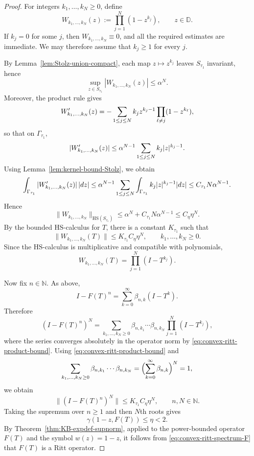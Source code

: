 \documentclass[11pt]{amsart}
\numberwithin{equation}{section}
\theoremstyle{definition}
\theoremstyle{plain}
\def\D{\mathbb{D}}
\newcommand{\HS}{\mathrm{HS}}
\begin{document}
\begin{proof}
For integers $k_1,\dots,k_N\ge0$, define
\[
W_{k_1,\dots,k_N}(z):=\prod_{j=1}^N(1-z^{k_j}),\qquad z\in\D.
\]
If \(k_j=0\) for some \(j\), then
\(W_{k_1,\dots,k_N}\equiv0\), and all the required estimates are
immediate.  We may therefore assume that \(k_j\ge1\) for every \(j\).

By Lemma~\ref{lem:Stolz-union-compact}, each map $z\mapsto z^{k_j}$ leaves $S_{\tau_1}$ invariant, hence
\[
\sup_{z\in S_{\tau_1}}|W_{k_1,\dots,k_N}(z)|\le \alpha^N.
\]
Moreover, the product rule gives
\[
W'_{k_1,\dots,k_N}(z)
=- \sum_{%
1\le j\le N%
} k_j z^{k_j-1}\prod_{\ell\ne j}(1-z^{k_\ell}),
\]
so that on $\Gamma_{\tau_1}$,
\[
|W'_{k_1,\dots,k_N}(z)|\le \alpha^{N-1}\sum_{
1\le j\le N%
} k_j|z|^{k_j-1}.
\]
Using Lemma~\ref{lem:kernel-bound-Stolz}, we obtain
\[
\int_{\Gamma_{\tau_1}}|W'_{k_1,\dots,k_N}(z)|\,|dz|
\le \alpha^{N-1}\sum_{
1\le j\le N%
}\int_{\Gamma_{\tau_1}}k_j|z|^{k_j-1}|dz|
\le C_{\tau_1}N\alpha^{N-1}.
\]
Hence
\[
\|W_{k_1,\dots,k_N}\|_{\HS(S_{\tau_1})}
\le \alpha^N+C_{\tau_1}N\alpha^{N-1}
\le C_\eta\eta^N.
\]
By the bounded \(\HS\)-calculus for $T$, there is a constant $K_{\tau_1}$ such that
\begin{equation}\label{eq:convex-ritt-product-bound}
\|W_{k_1,\dots,k_N}(T)\|\le K_{\tau_1}C_\eta\eta^N,
\qquad k_1,\dots,k_N\ge0.
\end{equation}
Since the \(\HS\)-calculus is multiplicative and compatible with polynomials,
\[
W_{k_1,\dots,k_N}(T)=\prod_{j=1}^N(I-T^{k_j}).
\]

Now fix $n\in\mathbb N$. As above,
\[
I-F(T)^n=\sum_{k=0}^\infty \beta_{n,k}(I-T^k).
\]
Therefore
\[
(I-F(T)^n)^N
=\sum_{k_1,\dots,k_N\ge0}\beta_{n,k_1}\cdots\beta_{n,k_N}
\prod_{j=1}^N(I-T^{k_j}),
\]
where the series converges absolutely in the operator norm by \eqref{eq:convex-ritt-product-bound}. Using \eqref{eq:convex-ritt-product-bound} and
\[
\sum_{k_1,\dots,k_N\ge0}\beta_{n,k_1}\cdots\beta_{n,k_N}=
\Bigl(\sum_{k=0}^\infty \beta_{n,k}\Bigr)^N=1,
\]
we obtain
\[
\|(I-F(T)^n)^N\|
\le K_{\tau_1}C_\eta\eta^N,
\qquad n,N\in\mathbb N.
\]
Taking the supremum over $n\ge1$ and then $N$th roots gives
\[
\gamma(1-z,F(T))\le \eta<2.
\]
By Theorem~\ref{thm:KB-expdef-supnorm}, applied to the power-bounded operator $F(T)$ and the symbol $w(z)=1-z$, it follows from \eqref{eq:convex-ritt-spectrum-F} that $F(T)$ is a Ritt operator.
\end{proof}
\end{document}

